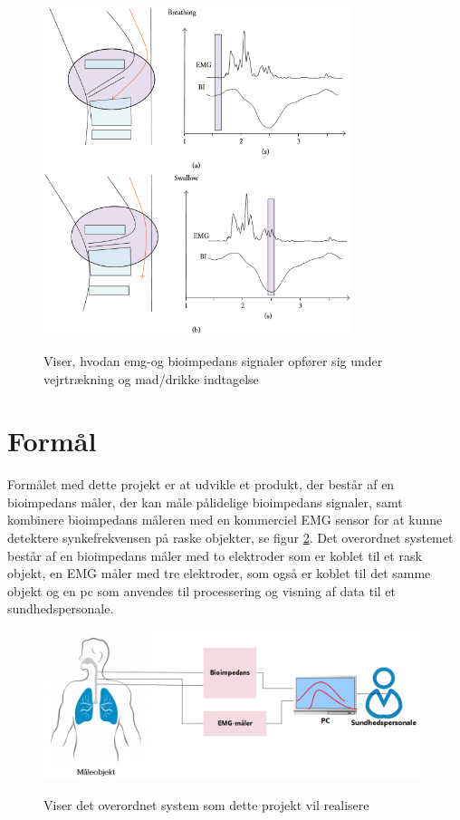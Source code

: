 \begin{figure}[H]
\centering
{\includegraphics[width=9cm]
{Figure/EMGBIGraph}}
\caption{Viser, hvodan emg-og bioimpedans signaler opfører sig under vejrtrækning og mad/drikke indtagelse\cite{Schultheiss2014}}
\label{EMGBIGraph}
\end{figure}

\section{Formål}

Formålet med dette projekt er at udvikle et produkt, der består af en bioimpedans måler, der kan måle pålidelige bioimpedans signaler, samt kombinere bioimpedans måleren med en kommerciel EMG sensor for at kunne detektere synkefrekvensen på raske objekter, se figur \ref{KonceptuelDiagram}. Det overordnet systemet består af en bioimpedans måler med to elektroder som er koblet til et rask objekt, en EMG måler med tre elektroder, som også er koblet til det samme objekt og en pc som anvendes til processering og visning af data til et sundhedspersonale.  

\begin{figure}[H]
\centering
{\includegraphics[width=11cm]
{Figure/KonceptuelDiagram}}
\caption{Viser det overordnet system som dette projekt vil realisere}
\label{KonceptuelDiagram}
\end{figure}

